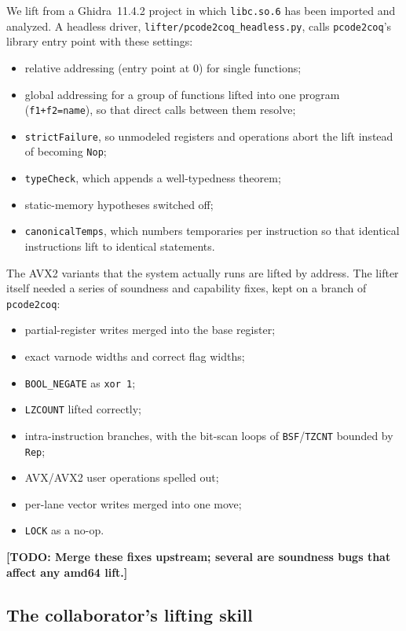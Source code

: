 \documentclass[11pt]{article}
\newcommand{\todo}[1]{\textbf{[TODO: #1]}}
\newcommand{\code}[1]{\texttt{#1}}
\begin{document}
We lift from a Ghidra~11.4.2 project in which \code{libc.so.6} has been
imported and analyzed.  A headless driver,
\code{lifter/pcode2coq\_headless.py}, calls \code{pcode2coq}'s library entry
point with these settings:
\begin{itemize}[nosep]
\item relative addressing (entry point at 0) for single functions;
\item global addressing for a group of functions lifted into one program
      (\code{f1+f2=name}), so that direct calls between them resolve;
\item \code{strictFailure}, so unmodeled registers and operations abort the
      lift instead of becoming \code{Nop};
\item \code{typeCheck}, which appends a well-typedness theorem;
\item static-memory hypotheses switched off;
\item \code{canonicalTemps}, which numbers temporaries per instruction so
      that identical instructions lift to identical statements.
\end{itemize}
The AVX2 variants that the system actually runs are lifted by address.  The
lifter itself needed a series of soundness and capability fixes, kept on a
branch of \code{pcode2coq}:
\begin{itemize}[nosep]
\item partial-register writes merged into the base register;
\item exact varnode widths and correct flag widths;
\item \code{BOOL\_NEGATE} as \code{xor 1};
\item \code{LZCOUNT} lifted correctly;
\item intra-instruction branches, with the bit-scan loops of
      \code{BSF}/\code{TZCNT} bounded by \code{Rep};
\item AVX/AVX2 user operations spelled out;
\item per-lane vector writes merged into one move;
\item \code{LOCK} as a no-op.
\end{itemize}
\todo{Merge these fixes upstream; several are soundness bugs that affect
any amd64 lift.}

\subsection{The collaborator's lifting skill}
\end{document}
